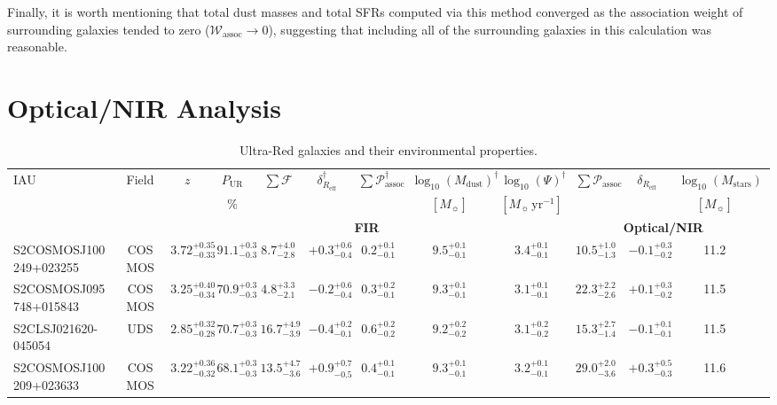 \documentclass[a4paper, fleqn, usenatbib]{mnras}
\newcommand{\fidelity}{\mathcal{F}}
\newcommand{\mdust}{M_{\text{dust}}}
\newcommand{\msol}{M_{\sun}}
\newcommand{\mstars}{M_{\text{stars}}}
\newcommand{\reff}{R_{\text{eff}}}
\begin{document}
Finally, it is worth mentioning that total dust masses and total SFRs computed via this method converged as the association weight of surrounding galaxies tended to zero ($\mathcal{W}_{\text{assoc}}\to0$), suggesting that including all of the surrounding galaxies in this calculation was reasonable.

\section{Optical/NIR Analysis}

\begin{landscape}
\begin{table}
    \caption{Ultra-Red galaxies and their environmental properties.}
    \label{tab:fir_nir_environments}
    \begin{tabular}{l c c c c c c c c c c c c}
        \hline
        IAU & Field & $z$ & $P_{\text{UR}}$ & $\sum\fidelity{}$ & $\delta_{\reff{}}^{\dagger}$ & $\sum\mathcal{P}_{\text{assoc}}^{\dagger}$ & $\log_{10}(\mdust{})^{\dagger}$ & $\log_{10}(\Psi)^{\dagger}$ & $\sum\mathcal{P}_{\text{assoc}}$ & $\delta_{\reff{}}$ & $\log_{10}(\mstars{})$\\
        & & & $\%$ & & & & $[\msol{}]$ & $[\msol{}\,\text{yr}^{-1}]$ & & & $[\msol{}]$\\
        & & \multicolumn{7}{c}{\dotfill\,\textbf{FIR}\,\dotfill} & \multicolumn{3}{c}{\dotfill\,\textbf{Optical/NIR}\,\dotfill}\\
        \hline
        S2COSMOSJ100249+023255 & COSMOS & $3.72^{+0.35}_{-0.33}$ & $91.1^{+0.3}_{-0.3}$ & $8.7^{+4.0}_{-2.8}$ & $+0.3^{+0.6}_{-0.4}$ & $0.2^{+0.1}_{-0.1}$ & $9.5^{+0.1}_{-0.1}$ & $3.4^{+0.1}_{-0.1}$ & $10.5^{+1.0}_{-1.3}$ & $-0.1^{+0.3}_{-0.2}$ & 11.2\\
        S2COSMOSJ095748+015843 & COSMOS & $3.25^{+0.40}_{-0.34}$ & $70.9^{+0.3}_{-0.3}$ & $4.8^{+3.3}_{-2.1}$ & $-0.2^{+0.6}_{-0.4}$ & $0.3^{+0.2}_{-0.1}$ & $9.3^{+0.1}_{-0.1}$ & $3.1^{+0.1}_{-0.1}$ & $22.3^{+2.2}_{-2.6}$ & $+0.1^{+0.3}_{-0.2}$ & 11.5\\
        S2CLSJ021620-045054 & UDS & $2.85^{+0.32}_{-0.28}$ & $70.7^{+0.3}_{-0.3}$ & $16.7^{+4.9}_{-3.9}$ & $-0.4^{+0.2}_{-0.1}$ & $0.6^{+0.2}_{-0.2}$ & $9.2^{+0.2}_{-0.2}$ & $3.1^{+0.2}_{-0.2}$ & $15.3^{+2.7}_{-1.4}$ & $-0.1^{+0.1}_{-0.1}$ & 11.5\\
        S2COSMOSJ100209+023633 & COSMOS & $3.22^{+0.36}_{-0.32}$ & $68.1^{+0.3}_{-0.3}$ & $13.5^{+4.7}_{-3.6}$ & $+0.9^{+0.7}_{-0.5}$ & $0.4^{+0.1}_{-0.1}$ & $9.3^{+0.1}_{-0.1}$ & $3.2^{+0.1}_{-0.1}$ & $29.0^{+2.0}_{-3.6}$ & $+0.3^{+0.5}_{-0.3}$ & 11.6\\

\end{tabular}
\end{table}
\end{landscape}
\end{document}
